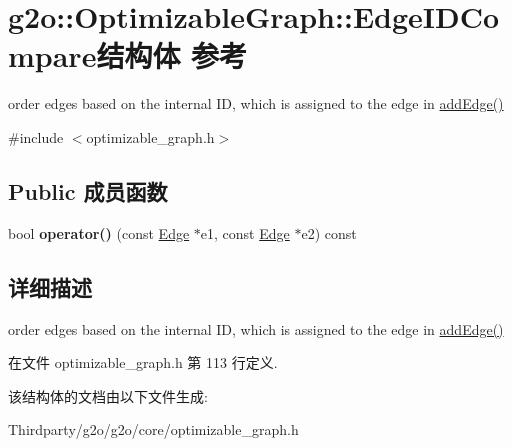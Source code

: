 \hypertarget{structg2o_1_1OptimizableGraph_1_1EdgeIDCompare}{\section{g2o\-:\-:Optimizable\-Graph\-:\-:Edge\-I\-D\-Compare结构体 参考}
\label{structg2o_1_1OptimizableGraph_1_1EdgeIDCompare}
}


order edges based on the internal I\-D, which is assigned to the edge in \hyperlink{structg2o_1_1OptimizableGraph_a6831ed69fce3dba691f53302a2813070}{add\-Edge()}  




{\ttfamily \#include $<$optimizable\-\_\-graph.\-h$>$}

\subsection*{Public 成员函数}
\begin{DoxyCompactItemize}
\item 
\hypertarget{structg2o_1_1OptimizableGraph_1_1EdgeIDCompare_a52149d3f574b16d109c2e33173365646}{bool {\bfseries operator()} (const \hyperlink{classg2o_1_1OptimizableGraph_1_1Edge}{Edge} $\ast$e1, const \hyperlink{classg2o_1_1OptimizableGraph_1_1Edge}{Edge} $\ast$e2) const }\label{structg2o_1_1OptimizableGraph_1_1EdgeIDCompare_a52149d3f574b16d109c2e33173365646}

\end{DoxyCompactItemize}


\subsection{详细描述}
order edges based on the internal I\-D, which is assigned to the edge in \hyperlink{structg2o_1_1OptimizableGraph_a6831ed69fce3dba691f53302a2813070}{add\-Edge()} 

在文件 optimizable\-\_\-graph.\-h 第 113 行定义.



该结构体的文档由以下文件生成\-:\begin{DoxyCompactItemize}
\item 
Thirdparty/g2o/g2o/core/optimizable\-\_\-graph.\-h\end{DoxyCompactItemize}
